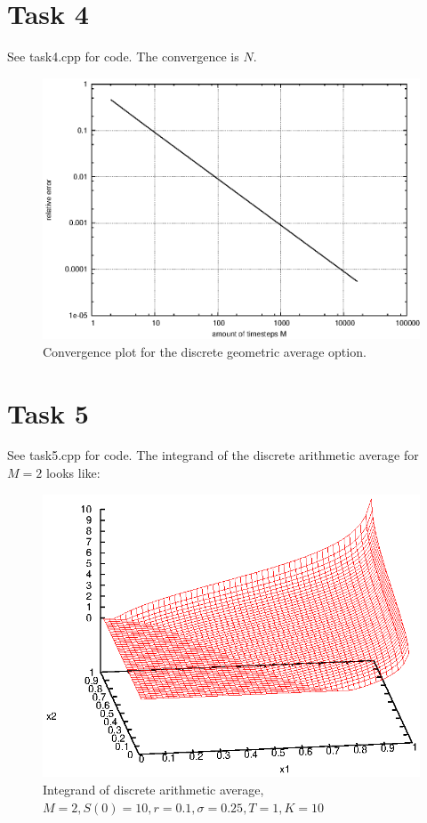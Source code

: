 \documentclass[]{article}
\begin{document}
\section*{Task 4} See task4.cpp for code. The convergence
is $N$.
\begin{figure}[!ht]
\centering
\includegraphics[width=.9\textwidth]{task4.eps}
\caption{Convergence plot for the discrete geometric average option.}
\label{fig:Task4}
\end{figure}
\clearpage

\section*{Task 5} See task5.cpp for code. The
integrand of the discrete arithmetic average for $M=2$ looks like:\\
\begin{figure}[!ht]
\centering
\includegraphics[width=.9\textwidth]{task5_1}
\caption{Integrand of discrete arithmetic average, $M=2,S(0)=10,r=0.1,\sigma=0.25,T=1,K=10$}
\label{fig:Task5}
\end{figure}
\clearpage
\end{document}
